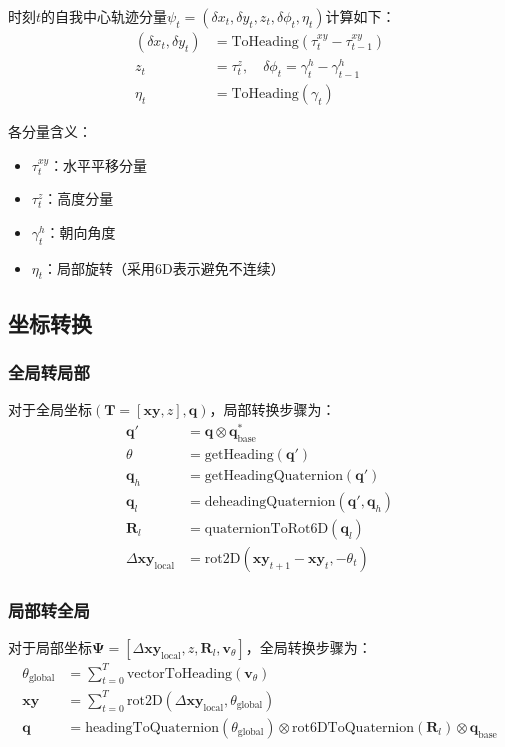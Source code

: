 \documentclass[UTF8]{ctexart}
\begin{document}
{时刻$t$的自我中心轨迹分量$\psi_t = (\delta x_t, \delta y_t, z_t, \delta\phi_t, \eta_t)$计算如下：
\begin{align}
    (\delta x_t, \delta y_t) &= \text{ToHeading}(\tau^{xy}_t - \tau^{xy}_{t-1}) \tag{3} \\
    z_t &= \tau^z_t, \quad \delta\phi_t = \gamma^h_t - \gamma^h_{t-1} \tag{4} \\
    \eta_t &= \text{ToHeading}(\gamma_t) \tag{5}
\end{align}

各分量含义：
\begin{itemize}
    \item $\tau^{xy}_t$：水平平移分量
    \item $\tau^z_t$：高度分量
    \item $\gamma^h_t$：朝向角度
    \item $\eta_t$：局部旋转（采用6D表示避免不连续）
\end{itemize}

\subsection*{坐标转换}

\subsubsection*{全局转局部}
对于全局坐标$(\mathbf{T} = [\mathbf{xy}, z], \mathbf{q})$，局部转换步骤为：
\begin{align}
    \mathbf{q}' &= \mathbf{q} \otimes \mathbf{q}_{\text{base}}^* \\
    \theta &= \text{getHeading}(\mathbf{q}') \\
    \mathbf{q}_h &= \text{getHeadingQuaternion}(\mathbf{q}') \\
    \mathbf{q}_l &= \text{deheadingQuaternion}(\mathbf{q}', \mathbf{q}_h) \\
    \mathbf{R}_l &= \text{quaternionToRot6D}(\mathbf{q}_l) \\
    \Delta\mathbf{xy}_{\text{local}} &= \text{rot2D}(\mathbf{xy}_{t+1} - \mathbf{xy}_t, -\theta_t)
\end{align}

\subsubsection*{局部转全局}
对于局部坐标$\mathbf{\Psi} = [\Delta\mathbf{xy}_{\text{local}}, z, \mathbf{R}_l, \mathbf{v}_{\theta}]$，全局转换步骤为：
\begin{align}
    \theta_{\text{global}} &= \sum_{t=0}^T \text{vectorToHeading}(\mathbf{v}_{\theta}) \\
    \mathbf{xy} &= \sum_{t=0}^T \text{rot2D}(\Delta\mathbf{xy}_{\text{local}}, \theta_{\text{global}}) \\
    \mathbf{q} &= \text{headingToQuaternion}(\theta_{\text{global}}) \otimes \text{rot6DToQuaternion}(\mathbf{R}_l) \otimes \mathbf{q}_{\text{base}}
\end{align}

}
\end{document}
